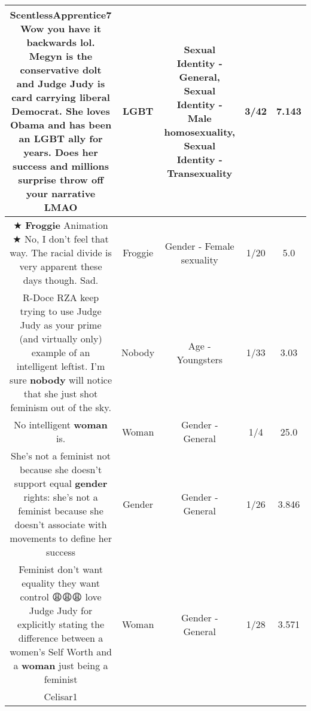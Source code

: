 \documentclass[11pt]{article}
\newlength\mylength
\begin{document}
\begin{center}
\begin{longtable}{|C{.65\mylength}|C{.30\mylength}|C{.12\mylength}|C{.12\mylength}|C{.12\mylength}|}
  \small ScentlessApprentice7 Wow you have it backwards lol. Megyn is the conservative dolt and Judge Judy is card carrying liberal Democrat. She loves Obama and has been an \textbf{L\textbf{G\textbf{BT}}} ally for years. Does her success and millions surprise throw off your narrative LMAO\normalsize   & LGBT & Sexual Identity - General, Sexual Identity - Male homosexuality, Sexual Identity - Transexuality & 3/42 & 7.143 \\  \hline
  \small ★ \textbf{Froggie} Animation ★ No, I don't feel that way. The racial divide is very apparent these days though. Sad.\normalsize   & Froggie & Gender - Female sexuality & 1/20 & 5.0 \\  \hline
  \small R-Doce RZA keep trying to use Judge Judy as your prime (and virtually only) example of an intelligent leftist.  I'm sure \textbf{nobody} will notice that she just shot feminism out of the sky.\normalsize   & Nobody & Age - Youngsters & 1/33 & 3.03 \\  \hline
  \small No intelligent \textbf{woman} is.\normalsize   & Woman & Gender - General & 1/4 & 25.0 \\  \hline
  \small She's not a feminist not because she doesn't support equal \textbf{gender} rights: she's not a feminist because she doesn't associate with movements to define her success\normalsize   & Gender & Gender - General & 1/26 & 3.846 \\  \hline
  \small Feminist don't want equality they want control 😩😩😩 love Judge Judy for explicitly stating the difference between a women's Self Worth and a \textbf{woman} just being a feminist\normalsize   & Woman & Gender - General & 1/28 & 3.571 \\  \hline
  \small Celisar1

\end{longtable}
\end{center}
\end{document}
